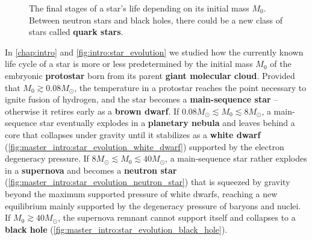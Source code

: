 \begin{figure}[b]
\caption{\label{fig:master_intro:star_evolution_end}%
	The final stages of a star's life depending on its initial mass $M_0$.
	Between neutron stars and black holes,
	there could be a new class of stars called \textbf{quark stars}.
}
\end{figure}

In \cref{chap:intro} and \cref{fig:intro:star_evolution} we studied how the currently known life cycle of a star
is more or less predetermined by the initial mass $M_0$ of the embryonic \textbf{protostar} born from its parent \textbf{giant molecular cloud}.
Provided that $M_0 \gtrsim 0.08 M_\odot$, the temperature in a protostar reaches the point necessary to ignite fusion of hydrogen, and the star becomes a \textbf{main-sequence star} -- otherwise it retires early as a \textbf{brown dwarf}.
If $0.08 M_\odot \lesssim M_0 \lesssim 8 M_\odot$, a main-sequence star eventually explodes in a \textbf{planetary nebula} and leaves behind a core that collapses under gravity until it stabilizes as a \textbf{white dwarf} (\cref{fig:master_intro:star_evolution_white_dwarf}) supported by the electron degeneracy pressure.
If $8 M_\odot \lesssim M_0 \lesssim 40 M_\odot$, a main-sequence star rather explodes in a \textbf{supernova} and becomes a \textbf{neutron star} (\cref{fig:master_intro:star_evolution_neutron_star}) that is squeezed by gravity beyond the maximum supported pressure of white dwarfs, reaching a new equilibrium mainly supported by the degeneracy pressure of baryons and nuclei.
If $M_0 \gtrsim 40 M_\odot$, the supernova remnant cannot support itself and collapses to a \textbf{black hole} (\cref{fig:master_intro:star_evolution_black_hole}).

